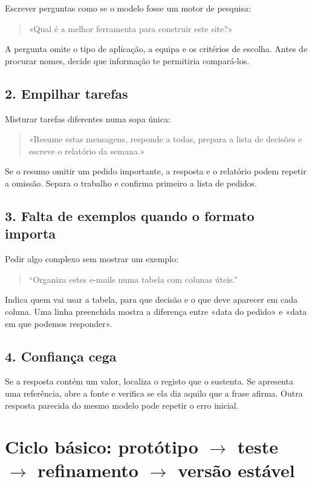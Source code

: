 Escrever perguntas como se o modelo fosse um motor de pesquisa:

\begin{quote}
\small
«Qual é a melhor ferramenta para construir este site?»
\end{quote}

A pergunta omite o tipo de aplicação, a equipa e os critérios de escolha. Antes de procurar nomes, decide que informação te permitiria compará-los.

\subsection*{2. Empilhar tarefas}

Misturar tarefas diferentes numa sopa única:

\begin{quote}
\small
«Resume estas mensagens, responde a todas, prepara a lista de decisões e escreve o relatório da semana.»
\end{quote}

Se o resumo omitir um pedido importante, a resposta e o relatório podem repetir a omissão. Separa o trabalho e confirma primeiro a lista de pedidos.

\subsection*{3. Falta de exemplos quando o formato importa}

Pedir algo complexo sem mostrar um exemplo:

\begin{quote}
\small
“Organiza estes e-mails numa tabela com colunas úteis.”
\end{quote}

Indica quem vai usar a tabela, para que decisão e o que deve aparecer em cada coluna. Uma linha preenchida mostra a diferença entre «data do pedido» e «data em que podemos responder».

\subsection*{4. Confiança cega}

Se a resposta contém um valor, localiza o registo que o sustenta. Se apresenta uma referência, abre a fonte e verifica se ela diz aquilo que a frase afirma. Outra resposta parecida do mesmo modelo pode repetir o erro inicial.

\section{Ciclo básico: protótipo \texorpdfstring{$\to$}{->} teste \texorpdfstring{$\to$}{->} refinamento \texorpdfstring{$\to$}{->} versão estável}

